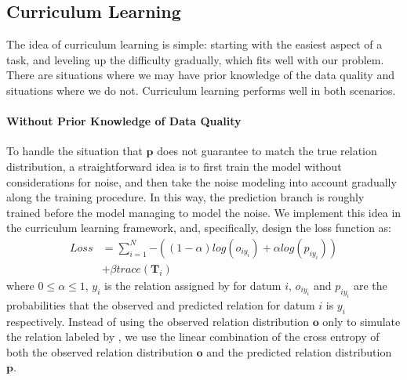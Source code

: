 \subsection{Curriculum Learning}
The idea of curriculum learning is simple: starting with the easiest aspect of a task, and leveling up the difficulty gradually,
which fits well with our problem.
There are situations where we may have prior knowledge of the data quality and situations where we do not. 
Curriculum learning performs well in both scenarios.  

\paragraph{Without Prior Knowledge of Data Quality}
To handle the situation that $\mathbf{p}$ does not guarantee to match the true relation distribution, a straightforward idea is to first train the model without considerations for noise,  and then take the noise modeling into account gradually along the training procedure. In this way, the prediction branch is roughly trained before the model managing to model the noise. We implement this idea in the curriculum learning framework, and,  specifically, 
design the loss function as:
%
%
\begin{equation}
\begin{aligned}
Loss	&=\sum_{i=1}^N{-((1-\alpha) log(o_{iy_{i}}) + \alpha log(p_{iy_{i}}))} \\
&+ \beta trace(\mathbf{T}_{i})
\end{aligned}
\label{general_loss}
\end{equation}
where $0\le\alpha\le1$, $y_i$ is the relation assigned by \DS for datum $i$, $o_{iy_{i}}$ and $p_{iy_{i}}$ are the probabilities that the observed and predicted relation for datum $i$ is $y_i$ respectively. Instead of using the observed relation distribution $\mathbf{o}$ only to simulate the relation labeled by \DS, we use the linear combination of the cross entropy of both the observed relation distribution $\mathbf{o}$ and the predicted relation distribution $\mathbf{p}$. 

